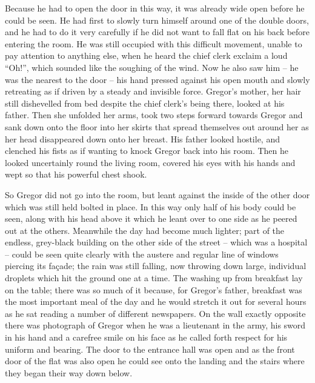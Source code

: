Because he had to open the door in this way, it was already wide open
before he could be seen. He had first to slowly turn himself around one
of the double doors, and he had to do it very carefully if he did not
want to fall flat on his back before entering the room. He was still
occupied with this difficult movement, unable to pay attention to
anything else, when he heard the chief clerk exclaim a loud “Oh!”,
which sounded like the soughing of the wind. Now he also saw him – he was
the nearest to the door – his hand pressed against his open mouth and
slowly retreating as if driven by a steady and invisible force.
Gregor’s mother, her hair still dishevelled from bed despite the chief
clerk’s being there, looked at his father. Then she unfolded her arms,
took two steps forward towards Gregor and sank down onto the floor into
her skirts that spread themselves out around her as her head
disappeared down onto her breast. His father looked hostile, and
clenched his fists as if wanting to knock Gregor back into his room.
Then he looked uncertainly round the living room, covered his eyes with
his hands and wept so that his powerful chest shook.

So Gregor did not go into the room, but leant against the inside of the
other door which was still held bolted in place. In this way only half
of his body could be seen, along with his head above it which he leant
over to one side as he peered out at the others. Meanwhile the day had
become much lighter; part of the endless, grey-black building on the
other side of the street – which was a hospital – could be seen quite
clearly with the austere and regular line of windows piercing its
façade; the rain was still falling, now throwing down large, individual
droplets which hit the ground one at a time. The washing up from
breakfast lay on the table; there was so much of it because, for
Gregor’s father, breakfast was the most important meal of the day and
he would stretch it out for several hours as he sat reading a number of
different newspapers. On the wall exactly opposite there was photograph
of Gregor when he was a lieutenant in the army, his sword in his hand
and a carefree smile on his face as he called forth respect for his
uniform and bearing. The door to the entrance hall was open and as the
front door of the flat was also open he could see onto the landing and
the stairs where they began their way down below.

